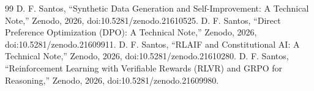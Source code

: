 \documentclass[conference]{IEEEtran}
\begin{document}
\begin{thebibliography}{99}
 D. F. Santos, ``Synthetic Data Generation and Self-Improvement: A Technical Note,'' Zenodo, 2026, doi:10.5281/zenodo.21610525.
 D. F. Santos, ``Direct Preference Optimization (DPO): A Technical Note,'' Zenodo, 2026, doi:10.5281/zenodo.21609911.
 D. F. Santos, ``RLAIF and Constitutional AI: A Technical Note,'' Zenodo, 2026, doi:10.5281/zenodo.21610280.
 D. F. Santos, ``Reinforcement Learning with Verifiable Rewards (RLVR) and GRPO for Reasoning,'' Zenodo, 2026, doi:10.5281/zenodo.21609980.
\end{thebibliography}
\end{document}
